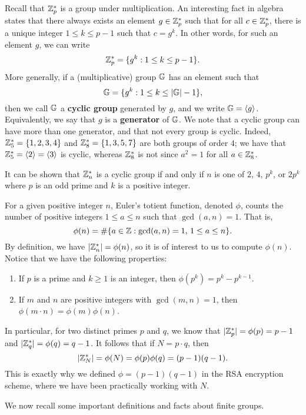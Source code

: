 Recall that $\mathbb{Z}_p^*$ is a group under multiplication. An interesting fact in algebra states that 
there always exists an element $g \in \mathbb{Z}_p^*$ such that for all $c \in \mathbb{Z}_p^*$, there is a unique 
integer $1 \leq k \leq p-1$ such that $c = g^k$. In other words, for such an element $g$, we can write 
\[ \mathbb{Z}_p^* = \{g^k : 1 \leq k \leq p-1\}. \]
More generally, if a (multiplicative) group $\mathbb{G}$ has an element such that 
\[ \mathbb{G} = \{g^k : 1 \leq k \leq |\mathbb{G}|-1\}, \]
then we call $\mathbb{G}$ a {\bf cyclic group} generated by $g$, and we write $\mathbb{G} = \langle g \rangle$. 
Equivalently, we say that $g$ is a {\bf generator} of $\mathbb{G}$. We note that a cyclic group can 
have more than one generator, and that not every group is cyclic. Indeed, $\mathbb{Z}_5^* = \{1, 2, 3, 4\}$ 
and $\mathbb{Z}_8^* = \{1, 3, 5, 7\}$ are both groups of order $4$; we have that $\mathbb{Z}_5^* = \langle 2 
\rangle = \langle 3 \rangle$ is cyclic, whereas $\mathbb{Z}_8^*$ is not since $a^2 = 1$ for all $a \in \mathbb{Z}_8^*$. 

It can be shown that $\mathbb{Z}_n^*$ is a cyclic group if and only if $n$ is one of $2$, $4$, $p^k$, or 
$2p^k$ where $p$ is an odd prime and $k$ is a positive integer. 

For a given positive integer $n$, Euler's totient function, denoted $\phi$, counts the number of positive
integers $1 \leq a \leq n$ such that $\gcd(a, n) = 1$. That is, 
\[ \phi(n) = \#\{a \in \mathbb{Z} : \gcd(a, n) = 1,\, 1 \leq a \leq n\}. \]
By definition, we have $|\mathbb{Z}_n^*| = \phi(n)$, so it is of interest to us to compute $\phi(n)$. 
Notice that we have the following properties:
\begin{enumerate}[(1)]
    \item If $p$ is a prime and $k \geq 1$ is an integer, then $\phi(p^k) = p^k - p^{k-1}$. 
    \item If $m$ and $n$ are positive integers with $\gcd(m, n) = 1$, then 
    $\phi(m \cdot n) = \phi(m) \phi(n)$. 
\end{enumerate}
In particular, for two distinct primes $p$ and $q$, we know that $|\mathbb{Z}_p^*| = \phi(p) = p-1$ 
and $|\mathbb{Z}_q^*| = \phi(q) = q-1$. It follows that if $N = p \cdot q$, then 
\[ |\mathbb{Z}_N^*| = \phi(N) = \phi(p)\phi(q) = (p-1)(q-1). \]
This is exactly why we defined $\phi = (p-1)(q-1)$ in the RSA encryption scheme, where we have been 
practically working with $N$. 

We now recall some important definitions and facts about finite groups. 

